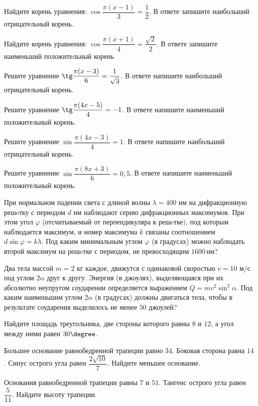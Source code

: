 \begin{class}[number=4]
	\begin{listofex}
		\item Найдите корень уравнения: \( \cos \dfrac{ \pi(x-1) }{ 3 }=\dfrac{ 1 }{ 2 } \). В ответе запишите наибольший отрицательный корень.
		\item Найдите корень уравнения: \( \cos \dfrac{ \pi(x+1) }{ 4 }=\dfrac{ \sqrt{2} }{ 2 } \). В ответе запишите наименьший положительный корень
		\item Решите уравнение \(\tg \dfrac{ \pi(x-3) }{ 6 }= \dfrac{ 1 }{ \sqrt{3} }\). В ответе напишите наибольший отрицательный корень.
		\item Решите уравнение \(\tg \dfrac{ \pi(4x-5) }{4 }= -1\). В ответе напишите наименьший положительный корень.
		\item Решите уравнение \( \sin \dfrac{ \pi(4x-3) }{ 4 }=1 \). В ответе напишите наибольший отрицательный корень.
		\item Решите уравнение \( \sin \dfrac{ \pi(8x+3) }{ 6 }=0,5 \). В ответе напишите наименьший положительный корень.
		\item При нормальном падении света с длиной волны \( \lambda=400 \) нм на дифракционную решeтку с периодом \(d\) нм наблюдают серию дифракционных максимумов. При этом угол \(\varphi\)  (отсчитываемый от перпендикуляра к решeтке), под которым наблюдается максимум, и номер максимума \(k\) связаны соотношением \(d \sin \varphi= k\lambda\). Под каким минимальным углом \(\varphi\) (в градусах) можно наблюдать второй максимум на решeтке с периодом, не превосходящим \(1600\) нм?
		\item Два тела массой \(m=2\) кг каждое, движутся с одинаковой скоростью  \(v =10\) м/с под углом \(2\alpha\) друг к другу. Энергия (в джоулях), выделяющаяся при их абсолютно неупругом соударении определяется выражением \(Q= m v^2 \sin^2 \alpha \). Под каким наименьшим углом \(2\alpha\) (в градусах) должны двигаться тела, чтобы в результате соударения выделилось не менее \(50\) джоулей?
		\item Найдите площадь треугольника, две стороны которого равны \(8\) и \(12\), а угол между ними равен \(30 \degree\).
		\item Большее основание равнобедренной трапеции равно \(34\). Боковая сторона равна \(14\). Синус острого угла равен \( \dfrac{ 2\sqrt{10}}{ 7 } \). Найдите меньшее основание.
		\item Основания равнобедренной трапеции равны \(7\) и \(51\). Тангенс острого угла равен \( \dfrac{ 5 }{ 11 } \).  Найдите высоту трапеции.
	\end{listofex}
\end{class}

